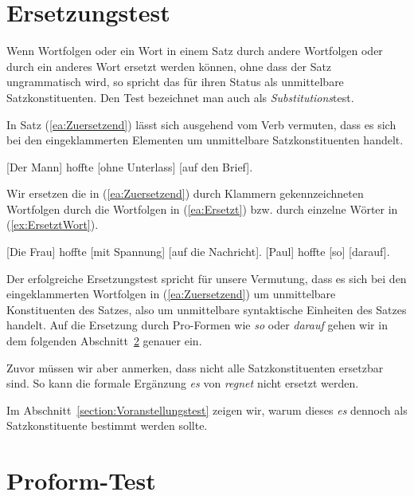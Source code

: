 \section{Ersetzungstest}\label{section:Ersetzung}

Wenn Wortfolgen oder ein Wort in einem Satz durch andere Wortfolgen oder durch ein anderes Wort ersetzt werden können, ohne dass der Satz ungrammatisch wird, so spricht das für ihren Status als unmittelbare Satzkonstituenten. Den Test bezeichnet man auch als \textit{Substitutions}test.

In Satz (\ref{ea:Zuersetzend}) lässt sich ausgehend vom Verb vermuten, dass es sich bei den eingeklammerten Elementen um unmittelbare Satzkonstituenten handelt. 

\ea \label{ea:Zuersetzend} [Der Mann] hoffte [ohne Unterlass] [auf den Brief].
\z 

Wir ersetzen die in (\ref{ea:Zuersetzend}) durch Klammern gekennzeichneten Wortfolgen durch die Wortfolgen in (\ref{ea:Ersetzt}) bzw. durch einzelne Wörter in (\ref{ex:ErsetztWort}).

\ea 
\ea \label{ea:Ersetzt} [Die Frau] hoffte [mit Spannung] [auf die Nachricht].
\ex \label{ex:ErsetztWort} [Paul] hoffte [so] [darauf].
\z 
\z 

Der erfolgreiche Ersetzungstest spricht für unsere Vermutung, dass es sich bei den eingeklammerten Wortfolgen in (\ref{ea:Zuersetzend}) um unmittelbare Konstituenten des Satzes, also um unmittelbare syntaktische Einheiten des Satzes handelt. Auf die Ersetzung durch Pro-Formen wie \textit{so} oder \textit{darauf} gehen wir in dem folgenden Abschnitt~\ref{section:Pronominalisierung} genauer ein.
 
Zuvor müssen wir aber anmerken, dass nicht alle Satzkonstituenten ersetzbar sind. So kann die formale Ergänzung \textit{es} von \textit{regnet} nicht ersetzt werden. 

\ea \label{ea:esregnet}
\label{ea:Ausgangssatzesregnet}
\label{ex:keineEsErsetzung}
\z
\z 

Im Abschnitt~\ref{section:Voranstellungstest} zeigen wir, warum dieses \textit{es} dennoch als Satzkonstituente bestimmt werden sollte.


\section{Proform-Test}\label{section:Pronominalisierung}

